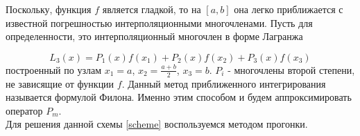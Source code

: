 Поскольку, функция $f$ является гладкой, то на $[a, b]$ она легко приближается 
с известной погрешностью интерполяционными многочленами. Пусть для 
определенности, это интерполяционный многочлен в форме Лагранжа

\begin{equation}
    L_3(x) = P_1(x)f(x_1) + P_2(x)f(x_2) + P_3(x)f(x_3)
\end{equation}
построенный по узлам $x_1 = a$, $x_2 = \frac{a + b}{2}$, $x_3 = b$. $P_i$ - 
многочлены второй степени, не зависящие от функции $f$. Данный метод 
приближенного интегрирования называется формулой Филона. Именно этим 
способом и будем аппроксимировать оператор $P_m$.\\

Для решения данной схемы \eqref{scheme} воспользуемся методом прогонки.
